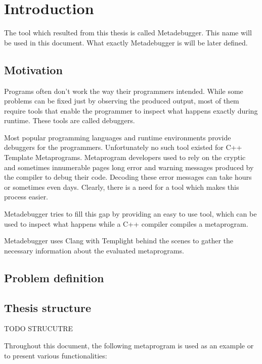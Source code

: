 
\chapter{Introduction}

The tool which resulted from this thesis is called Metadebugger. This name will
be used in this document. What exactly Metadebugger is will be later defined.

\section{Motivation}

Programs often don't work the way their programmers intended. While some
problems can be fixed just by observing the produced output, most of them
require tools that enable the programmer to inspect what happens exactly
during runtime. These tools are called debuggers.

Most popular programming languages and runtime environments provide debuggers
for the programmers. Unfortunately no such tool existed for C++ Template
Metaprograms. Metaprogram developers used to rely on the cryptic and sometimes
innumerable pages long error and warning messages produced by the compiler to
debug their code. Decoding these error messages can take hours or sometimes
even days. Clearly, there is a need for a tool which makes this process easier.

Metadebugger tries to fill this gap by providing an easy to use tool, which can
be used to inspect what happens while a C++ compiler compiles a metaprogram.

Metadebugger uses Clang with Templight behind the scenes to gather the
necessary information about the evaluated metaprograms.

\section{Problem definition}

\section{Thesis structure}

TODO STRUCUTRE

Throughout this document, the following metaprogram is used as an example or to
present various functionalities:

